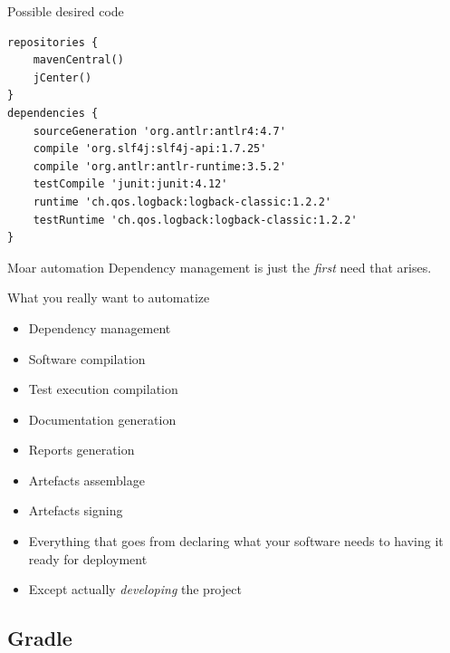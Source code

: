 \documentclass[presentation]{beamer}
\begin{document}
\begin{frame}[fragile]{Possible desired code}
  \begin{block}{}
    \begin{verbatim}
repositories {
    mavenCentral()
    jCenter()
}
dependencies {
    sourceGeneration 'org.antlr:antlr4:4.7'
    compile 'org.slf4j:slf4j-api:1.7.25'
    compile 'org.antlr:antlr-runtime:3.5.2'
    testCompile 'junit:junit:4.12'
    runtime 'ch.qos.logback:logback-classic:1.2.2'
    testRuntime 'ch.qos.logback:logback-classic:1.2.2'
}
    \end{verbatim}
  \end{block}
\end{frame}


\begin{frame}[fragile]{Moar automation}
	Dependency management is just the \textit{first} need that arises.
	
	\begin{block}{What you really want to automatize}
		\begin{itemize}
			\item Dependency management
			\item Software compilation
			\item Test execution compilation
			\item Documentation generation
			\item Reports generation
			\item Artefacts assemblage
			\item Artefacts signing
		\end{itemize}
	\end{block}
	\begin{itemize}
		\item Everything that goes from declaring what your software needs to having it ready for deployment
		\item Except actually \textit{developing} the project
	\end{itemize}
\end{frame}

\subsection{Gradle}
\end{document}
